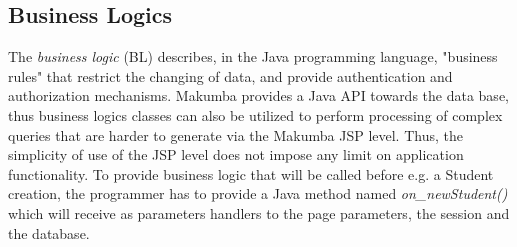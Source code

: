 \documentclass{chi2009}
\begin{document}
\subsection{Business Logics}
The \textit{business logic} (BL) describes, in the Java programming language, "business rules" that restrict the changing of data, and provide authentication and authorization mechanisms. Makumba provides a Java API towards the data base, thus business logics classes can also be utilized to perform processing of complex queries that are harder to generate via the Makumba JSP level. Thus, the simplicity of use of the JSP level does not impose any limit on application functionality. To provide business logic that will be called before e.g. a Student creation, the programmer has to provide a Java method named \textit{on\_newStudent()} which will receive as parameters handlers to the page parameters, the session and the database.


\end{document}
